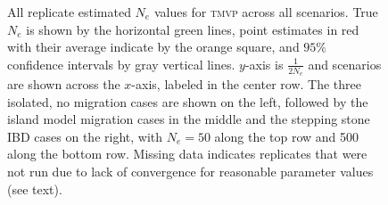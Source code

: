 \begin{landscape}
\begin{figure}[ht]
\centering
{}
\caption[ ~~ - All replicate estimated $N_e$ values for \textsc{tmvp} across all scenarios.]{All replicate estimated $N_e$ values for \textsc{tmvp} across all scenarios. True $N_e$ is shown by the horizontal green lines, point estimates in red with their average indicate by the orange square, and $95\%$ confidence intervals by gray vertical lines. $y$-axis is $\frac{1}{2 N_e}$ and scenarios are shown across the $x$-axis, labeled in the center row. The three isolated, no migration cases are shown on the left, followed by the island model migration cases in the middle and the stepping stone IBD cases on the right, with $N_e = 50$ along the top row and 500 along the bottom row. Missing data indicates replicates that were not run due to lack of convergence for reasonable parameter values (see text).}
\label{fig:supp_tmvp}
\end{figure}



\end{landscape}
